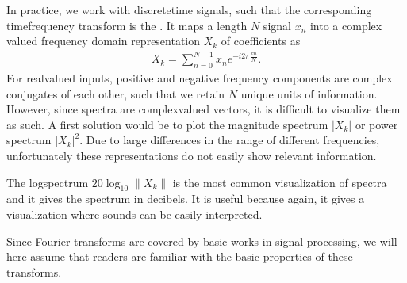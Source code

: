 \documentclass[letterpaper,10pt,english]{jupyterBook}
\begin{document}
\sphinxAtStartPar
In practice, we work with discrete\sphinxhyphen{}time signals, such that the
corresponding time\sphinxhyphen{}frequency transform is the . It
maps a length \(N\) signal \(x_{n}\) into a complex valued frequency
domain representation \(X_{k}\) of  coefficients as
\begin{equation*}
\begin{split} X_k = \sum_{n=0}^{N-1}x_n e^{-i2\pi\frac{kn}N}. \end{split}
\end{equation*}
\sphinxAtStartPar
For real\sphinxhyphen{}valued inputs, positive and negative frequency components are
complex conjugates of each other, such that we retain \(N\) unique units
of information. However, since spectra are complex\sphinxhyphen{}valued vectors, it is
difficult to visualize them as such. A first solution would be to plot
the magnitude spectrum \(|X_{k}|\) or power
spectrum \(|X_{k}|^2\). Due to large differences in
the range of different frequencies, unfortunately these representations
do not easily show relevant information.

\sphinxAtStartPar
The log\sphinxhyphen{}spectrum  \( 20\log_{10}\|X_k\| \) is the most common
visualization of spectra and it gives the spectrum in decibels. It is
useful because again, it gives a visualization where sounds can be
easily interpreted.

\sphinxAtStartPar
Since Fourier transforms are covered by basic works in signal
processing, we will here assume that readers are familiar with the basic
properties of these transforms.
\end{document}
